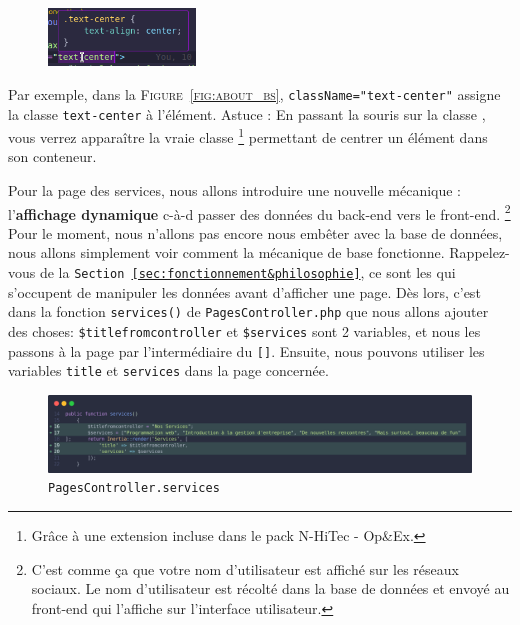 \begin{figure}
    \vspace{-0.5cm}
    \includegraphics[width=0.35\textwidth]{figures-C1/tailwind_intellisense.png}
\end{figure}
Par exemple, dans la \textsc{Figure~\ref{fig:about_bs}}, \verb|className="text-center"| assigne la classe \verb|text-center| à l'élément. Astuce : En passant la souris sur la classe \tailwind{}, vous verrez apparaître la vraie classe \css{}\footnote{Grâce à une extension incluse dans le pack N-HiTec - Op\&Ex.} permettant de centrer un élément dans son conteneur.



Pour la page des services, nous allons introduire une nouvelle mécanique : l'\textbf{affichage dynamique} c-à-d passer des données du back-end vers le front-end. \footnote{C'est comme ça que votre nom d'utilisateur est affiché sur les réseaux sociaux. Le nom d'utilisateur est récolté dans la base de données et envoyé au front-end qui l'affiche sur l'interface utilisateur.} Pour le moment, nous n'allons pas encore nous embêter avec la base de données, nous allons simplement voir comment la mécanique de base fonctionne. Rappelez-vous de la \texttt{Section~\ref{sec:fonctionnement&philosophie}}, ce sont les \controllers{} qui s'occupent de manipuler les données avant d'afficher une page. Dès lors, c'est dans la fonction \verb|services()| de \verb|PagesController.php| que nous allons ajouter des choses: \verb|$titlefromcontroller| et \verb|$services| sont 2 variables, et nous les passons à la page par l'intermédiaire du \verb|[]|. Ensuite, nous pouvons utiliser les variables \verb|title| et \verb|services| dans la page concernée.

\begin{figure}[h]
    \centering
    \includegraphics[width=\textwidth]{figures-C1/services_update.png}
    \caption{\texttt{PagesController.services}}
\end{figure}

